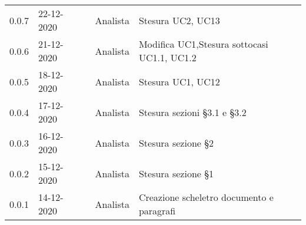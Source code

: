 {{\begin{longtable}{C{1.7cm} C{2.5cm} C{3.2cm} C{2.7cm} C{4.8cm}}
0.0.7 & 22-12-2020 & \SG{} & Analista & Stesura UC2, UC13\\
0.0.6 & 21-12-2020 & \BM{} & Analista & Modifica UC1,\newline Stesura sottocasi UC1.1, UC1.2\\
0.0.5 & 18-12-2020 & \SP{} & Analista & Stesura UC1, UC12\\
0.0.4 & 17-12-2020 & \SP{} & Analista & Stesura sezioni §3.1 e §3.2\\	
0.0.3 & 16-12-2020 & \SP{} & Analista & Stesura sezione §2\\
0.0.2 & 15-12-2020 & \SP{} & Analista & Stesura sezione §1\\
0.0.1 & 14-12-2020 & \SP{} & Analista & Creazione scheletro documento e paragrafi\\
		
\end{longtable}
}
}
